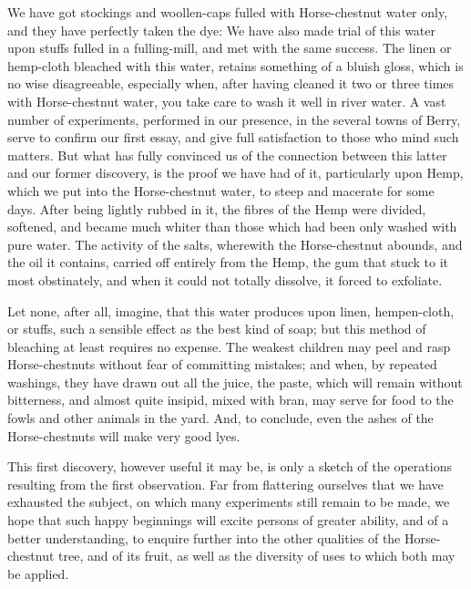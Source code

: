 \documentclass[a4paper, 11pt, oneside, polutonikogreek, english]{article}
\begin{document}
We have got stockings and woollen-caps fulled with Horse-chestnut water only, and they have perfectly taken the dye: We have also made trial of this water upon stuffs fulled in a fulling-mill, and met with the same success. The linen or hemp-cloth bleached with this water, retains something of a bluish gloss, which is no wise disagreeable, especially when, after having cleaned it two or three times with Horse-chestnut water, you take care to wash it well in river water. A vast number of experiments, performed in our presence, in the several towns of Berry, serve to confirm our first essay, and give full satisfaction to those who mind such matters. But what has fully convinced us of the connection between this latter and our former discovery, is the proof we have had of it, particularly upon Hemp, which we put into the Horse-chestnut water, to steep and macerate for some days. After being lightly rubbed in it, the fibres of the Hemp were divided, softened, and became much whiter than those which had been only washed with pure water. The activity of the salts, wherewith the Horse-chestnut abounds, and the oil it contains, carried off entirely from the Hemp, the gum that stuck to it most obstinately, and when it could not totally dissolve, it forced to exfoliate.

Let none, after all, imagine, that this water produces upon linen, hempen-cloth, or stuffs, such a sensible effect as the best kind of soap; but this method of bleaching at least requires no expense. The weakest children may peel and rasp Horse-chestnuts without fear of committing mistakes; and when, by repeated washings, they have drawn out all the juice, the paste, which will remain without bitterness, and almost quite insipid, mixed with bran, may serve for food to the fowls and other animals in the yard. And, to conclude, even the ashes of the Horse-chestnuts will make very good lyes.

This first discovery, however useful it may be, is only a sketch of the operations resulting from the first observation. Far from flattering ourselves that we have exhausted the subject, on which many experiments still remain to be made, we hope that such happy beginnings will excite persons of greater ability, and of a better understanding, to enquire further into the other qualities of the Horse-chestnut tree, and of its fruit, as well as the diversity of uses to which both may be applied.
\end{document}
